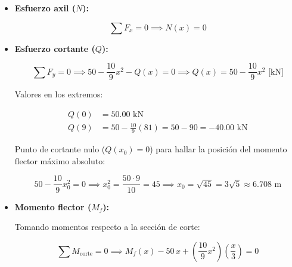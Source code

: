 \begin{itemize}

    \item \textbf{Esfuerzo axil ($N$):}

          \begin{equation}

              \sum F_x = 0 \implies \boxed{N(x) = 0}

          \end{equation}



    \item \textbf{Esfuerzo cortante ($Q$):}

          \begin{equation}

              \sum F_y = 0 \implies 50 - \frac{10}{9}x^2 - Q(x) = 0 \implies \boxed{Q(x) = 50 - \frac{10}{9}x^2\text{ [kN]}}

          \end{equation}

          Valores en los extremos:

          \begin{align*}

              Q(0) & = 50.00\text{ kN}                                    \\

              Q(9) & = 50 - \frac{10}{9}(81) = 50 - 90 = -40.00\text{ kN}

          \end{align*}

          Punto de cortante nulo ($Q(x_0) = 0$) para hallar la posición del momento flector máximo absoluto:

          \begin{equation}

              50 - \frac{10}{9}x_0^2 = 0 \implies x_0^2 = \frac{50 \cdot 9}{10} = 45 \implies x_0 = \sqrt{45} = 3\sqrt{5} \approx \boxed{6.708\text{ m}}

          \end{equation}



    \item \textbf{Momento flector ($M_f$):}

          Tomando momentos respecto a la sección de corte:

          \begin{equation}

              \sum M_{\text{corte}} = 0 \implies M_f(x) - 50\,x + \left(\frac{10}{9}x^2\right)\left(\frac{x}{3}\right) = 0


\end{equation}
\end{itemize}
